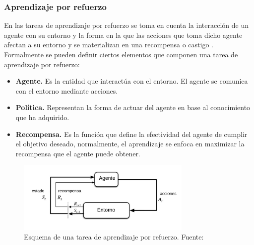         \subsubsection{Aprendizaje por refuerzo}
        En las tareas de aprendizaje por refuerzo se toma en cuenta la interacción de un agente con su entorno y la forma 
        en la que las acciones que toma dicho agente afectan a su entorno y se materializan en una recompensa o castigo \cite{sutton2018reinforcement}. Formalmente
        se pueden definir ciertos elementos que componen una tarea de aprendizaje por refuerzo:
        \begin{itemize}
            \item \textbf{Agente.} Es la entidad que interactúa con el entorno. El agente se comunica con el entorno mediante acciones.
            \item \textbf{Política.} Representan la forma de actuar del agente en base al conocimiento que ha adquirido.
            \item \textbf{Recompensa.} Es la función que define la efectividad del agente de cumplir el objetivo deseado, normalmente, el aprendizaje se enfoca en maximizar la recompensa que el agente puede obtener. 
        \end{itemize}
        
        \begin{figure}[!h] 
            \centering
            \includegraphics[width=0.75\textwidth]{img/refuerzo}
            \caption[Esquema de una tarea de aprendizaje por refuerzo]{Esquema de una tarea de aprendizaje por refuerzo. Fuente: \cite{bhatt_2018} }
            \label{fig:refuerzo}
        \end{figure}

        
